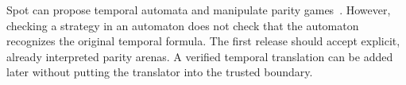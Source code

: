 Spot can propose temporal automata and manipulate parity games~\cite{spot}.
However, checking a strategy in an automaton does not check that the automaton
recognizes the original temporal formula. The first release should accept
explicit, already interpreted parity arenas. A verified temporal translation
can be added later without putting the translator into the trusted boundary.
